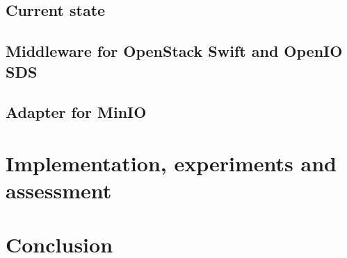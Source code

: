 \section{Current state}
\section{Middleware for OpenStack Swift and OpenIO SDS}
\section{Adapter for MinIO}
\chapter{Implementation, experiments and assessment}

\chapter{Conclusion}

